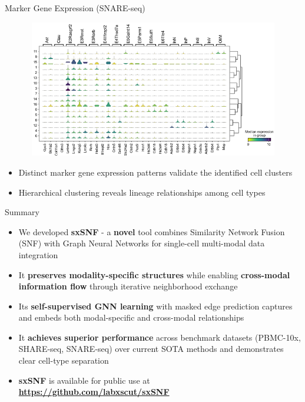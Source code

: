 \documentclass{beamer}
\newcommand{\hrefcol}[2]{\textcolor{sintefyellow}{\textbf{\href{#1}{#2}}}}
\begin{document}
\begin{frame}{Marker Gene Expression (SNARE-seq)}

\centering
\includegraphics[width=1.0\textwidth,height=6cm,keepaspectratio]{./sxSNF_figure/figure_6.png}

\begin{itemize}\scriptsize
    \item Distinct marker gene expression patterns validate the identified cell clusters
    \item Hierarchical clustering reveals lineage relationships among cell types
\end{itemize}

\end{frame}



\begin{frame}{Summary}

\normalsize
\begin{itemize}
\item We developed \textcolor{sintefyellow}{\textbf{sxSNF}} - a \textcolor{sintefyellow}{\textbf{novel}} tool combines Similarity Network Fusion (SNF) with Graph Neural Networks for single-cell multi-modal data integration
\item It \textcolor{sintefyellow}{\textbf{preserves modality-specific structures}} while enabling \textcolor{sintefyellow}{\textbf{cross-modal information flow}} through iterative neighborhood exchange
\item Its \textcolor{sintefyellow}{\textbf{self-supervised GNN learning}} with masked edge prediction captures and embeds both modal-specific and cross-modal relationships
\item It \textcolor{sintefyellow}{\textbf{achieves superior performance}} across benchmark datasets (PBMC-10x, SHARE-seq, SNARE-seq) over current SOTA methods and demonstrates clear cell-type separation
\item \textbf{sxSNF} is available for public use at \hrefcol{https://github.com/labxscut/sxSNF}{https://github.com/labxscut/sxSNF}
\end{itemize} 

\end{frame}
\end{document}
